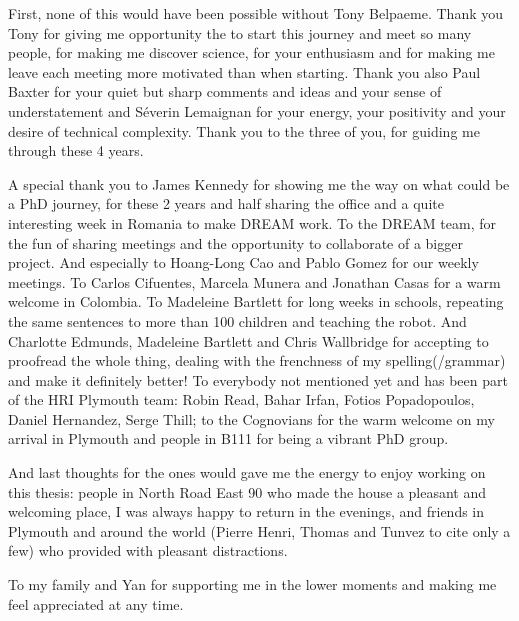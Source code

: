 First, none of this would have been possible without Tony Belpaeme. Thank you Tony for giving me opportunity the to start this journey and meet so many people, for making me discover science, for your enthusiasm and for making me leave each meeting more motivated than when starting. Thank you also Paul Baxter for your quiet but sharp comments and ideas and your sense of understatement and S\'{e}verin Lemaignan for your energy, your positivity and your desire of technical complexity. Thank you to the three of you, for guiding me through these 4 years.

A special thank you to James Kennedy for showing me the way on what could be a PhD journey, for these 2 years and half sharing the office and a quite interesting week in Romania to make DREAM work. To the DREAM team, for the fun of sharing meetings and the opportunity to collaborate of a bigger project. And especially to Hoang-Long Cao and Pablo Gomez for our weekly meetings. To Carlos Cifuentes, Marcela Munera and Jonathan Casas for a warm welcome in Colombia. To Madeleine Bartlett for long weeks in schools, repeating the same sentences to more than 100 children and teaching the robot. And Charlotte Edmunds, Madeleine Bartlett and Chris Wallbridge for accepting to proofread the whole thing, dealing with the frenchness of my spelling(/grammar) and make it definitely better! To everybody not mentioned yet and has been part of the HRI Plymouth team: Robin Read, Bahar Irfan, Fotios Popadopoulos, Daniel Hernandez, Serge Thill; to the Cognovians for the warm welcome on my arrival in Plymouth and people in B111 for being a vibrant PhD group.

And last thoughts for the ones would gave me the energy to enjoy working on this thesis: people in North Road East 90 who made the house a pleasant and welcoming place, I was always happy to return in the evenings, and friends in Plymouth and around the world (Pierre Henri, Thomas and Tunvez to cite only a few) who provided with pleasant distractions.

To my family and Yan for supporting me in the lower moments and making me feel appreciated at any time.